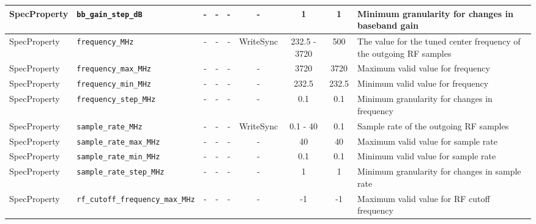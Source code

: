 \documentclass{article}
\begin{document}
\begin{landscape}
\begin{scriptsize}
\begin{tabular}{|p{2cm}|p{4cm}|c|c|c|c|c|c|p{6.5cm}|}
			\hline
			SpecProperty & \verb+bb_gain_step_dB+              & -    & -        & -          & -              & 1            & 1       & Minimum granularity for changes in baseband gain                                              \\
			\hline
			SpecProperty & \verb+frequency_MHz+                & -    & -        & -          & WriteSync      & 232.5 - 3720 & 500     & The value for the tuned center frequency of the outgoing RF samples                           \\
			\hline
			SpecProperty & \verb+frequency_max_MHz+            & -    & -        & -          & -              & 3720         & 3720    & Maximum valid value for frequency                                                             \\
			\hline
			SpecProperty & \verb+frequency_min_MHz+            & -    & -        & -          & -              & 232.5        & 232.5   & Minimum valid value for frequency                                                             \\
			\hline
			SpecProperty & \verb+frequency_step_MHz+           & -    & -        & -          & -              & 0.1          & 0.1     & Minimum granularity for changes in frequency                                                  \\
			\hline
			SpecProperty & \verb+sample_rate_MHz+              & -    & -        & -          & WriteSync      & 0.1 - 40     & 0.1     & Sample rate of the outgoing RF samples                                                        \\
			\hline
			SpecProperty & \verb+sample_rate_max_MHz+          & -    & -        & -          & -              & 40           & 40      & Maximum valid value for sample rate                                                           \\
			\hline
			SpecProperty & \verb+sample_rate_min_MHz+          & -    & -        & -          & -              & 0.1          & 0.1     & Minimum valid value for sample rate                                                           \\
			\hline
			SpecProperty & \verb+sample_rate_step_MHz+         & -    & -        & -          & -              & 1            & 1       & Minimum granularity for changes in sample rate                                                \\
			\hline
			SpecProperty & \verb+rf_cutoff_frequency_max_MHz+  & -    & -        & -          & -              & -1           & -1      & Maximum valid value for RF cutoff frequency                                                   \\

\end{tabular}
\end{scriptsize}
\end{landscape}
\end{document}
